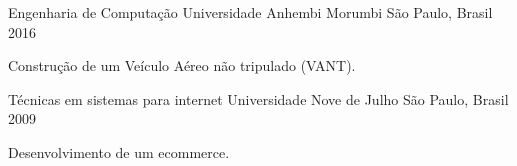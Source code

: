 \begin{cventries}
  \cventry
    {Engenharia de Computação}
    {Universidade Anhembi Morumbi}
    {São Paulo, Brasil}
    {2016}
    {
      \begin{cvitems}
        \item {Construção de um Veículo Aéreo não tripulado (VANT).}
      \end{cvitems}
    }
  \cventry
    {Técnicas em sistemas para internet}
    {Universidade Nove de Julho}
    {São Paulo, Brasil}
    {2009}
    {
      \begin{cvitems}
        \item {Desenvolvimento de um ecommerce.}
      \end{cvitems}
    }

\end{cventries}
